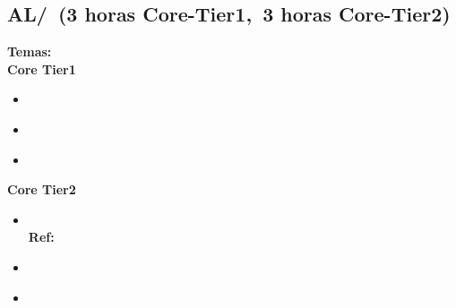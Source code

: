 \subsection{AL/\ALBasicAutomataComputabilityandComplexity~(3 horas Core-Tier1,~3 horas Core-Tier2)}\label{sec:BOK:ALBasicAutomataComputabilityandComplexity}
\noindent \textbf{Temas:}\\
\noindent \textbf{Core Tier1}
\begin{itemize}
	\item \ALBasicAutomataComputabilityandComplexityTopicFinite\label{sec:BOK:ALBasicAutomataComputabilityandComplexityTopicFinite}
	\item \ALBasicAutomataComputabilityandComplexityTopicRegular\label{sec:BOK:ALBasicAutomataComputabilityandComplexityTopicRegular}
	\item \ALBasicAutomataComputabilityandComplexityTopicThe\label{sec:BOK:ALBasicAutomataComputabilityandComplexityTopicThe}
\end{itemize}

\noindent \textbf{Core Tier2}
\begin{itemize}
	\item \ALBasicAutomataComputabilityandComplexityTopicContext\xspace \\ \textbf{Ref:} \label{sec:BOK:ALBasicAutomataComputabilityandComplexityTopicContext}
	\item \ALBasicAutomataComputabilityandComplexityTopicIntroduction\label{sec:BOK:ALBasicAutomataComputabilityandComplexityTopicIntroduction}
	\item \ALBasicAutomataComputabilityandComplexityTopicIntroductionTo\label{sec:BOK:ALBasicAutomataComputabilityandComplexityTopicIntroductionTo}
\end{itemize}



